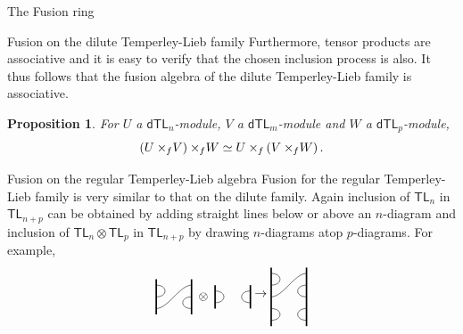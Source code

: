 \documentclass[reqno]{amsart}
\newtheorem{Prop}[Thm]{Proposition}
\newcommand{\dtl}[1]{\mathsf{dTL}_{#1}}
\newcommand{\tl}[1]{\mathsf{TL}_{#1}}
\newcommand{\xf}{\times\hspace{-0.27em}_f}
\begin{document}
\begin{section}{The Fusion ring}
\begin{subsection}{Fusion on the dilute Temperley-Lieb family}
Furthermore, tensor products are associative and it is easy to verify that the chosen inclusion process is also. It thus follows that the fusion algebra of the dilute Temperley-Lieb family is associative.
\begin{Prop}
For $U$ a  $\dtl{n}$-module, $V$ a $\dtl{m}$-module and $W$ a $\dtl{p}$-module,
\begin{equation}
\left(U \xf V\right)\xf W \simeq U\xf \left(V \xf W \right).
\end{equation}
\end{Prop}
\end{subsection}
\begin{subsection}{Fusion on the regular Temperley-Lieb algebra}
Fusion for the regular Temperley-Lieb family is very similar to that on the dilute family. Again inclusion of $\tl{n}$ in $\tl{n+p}$ can be obtained by adding straight lines below or above an $n$-diagram and inclusion of $\tl{n}\otimes\tl{p}$ in $\tl{n+p}$ by drawing $n$-diagrams atop $p$-diagrams. For example,
\begin{equation}
\begin{tikzpicture}[baseline={(current bounding box.center)},scale = 1/3]
\draw[very thick] (0,-3/2) -- (0,3/2);
\draw[very thick] (3,-3/2) -- (3,3/2);
	\draw (0,-1) .. controls (1,-1) and (2,1) .. (3,1);
	\draw (0,0) .. controls (1,0) and (1,1) .. (0,1);
	\draw (3,-1) .. controls (2,-1) and (2,0) .. (3,0);
%
\node  at (4,0) {$\otimes$};
%
\draw[very thick] (5,-1) -- (5,1);
\draw[very thick] (8,-1) -- (8,1);
	\draw (5,-1/2) .. controls (6,-1/2) and (6,1/2) .. (5,1/2);
	\draw (8,-1/2) .. controls (7,-1/2) and (7,1/2) .. (8,1/2);
\end{tikzpicture}
\to
\begin{tikzpicture}[baseline={(current bounding box.center)},scale = 1/3]
\draw[very thick] (0,-5/2) -- (0,5/2);
\draw[very thick] (3,-5/2) -- (3,5/2);
	\draw (0, -2) .. controls (1,-2) and (1,-1) .. (0,-1);
	\draw (0,0) .. controls (1,0) and (2,2) .. (3,2);
	\draw (0,1) .. controls (1,1) and (1,2) .. (0,2);
	\draw (3,-2) .. controls (2,-2) and (2,-1) .. (3,-1);
	\draw (3,0) .. controls (2,0) and (2,1) .. (3,1);
\end{tikzpicture}
\end{equation}


\end{subsection}
\end{section}
\end{document}
